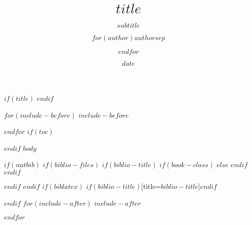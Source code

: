 \documentclass[$if(fontsize)$$fontsize$,$else$12pt,$endif$$if(handout)$handout,$endif$$if(beamer)$ignorenonframetext,$endif$$for(classoption)$$classoption$$sep$,$endfor$]{$documentclass$}
\title{$title$}
\subtitle{$subtitle$}
\author{\small $for(author)$$author$$sep$ \and $endfor$}
\date{$date$}
\institute{$institute$}
\begin{document}
$if(title)$
{
}
$endif$

$for(include-before)$
$include-before$

$endfor$
$if(toc)$
\begin{frame}
\tableofcontents[hideallsubsections]
\end{frame}

$endif$
$body$

$if(natbib)$
$if(biblio-files)$
$if(biblio-title)$
$if(book-class)$
\renewcommand\bibname{$biblio-title$}
$else$
\renewcommand\refname{$biblio-title$}
$endif$
$endif$


$endif$
$endif$
$if(biblatex)$
\printbibliography$if(biblio-title)$[title=$biblio-title$]$endif$

$endif$
$for(include-after)$
$include-after$

$endfor$
\end{document}
